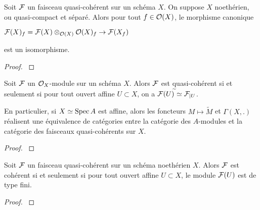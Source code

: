 \begin{prop}\label{FQCProp2}
Soit $\mathcal{F}$ un faisceau quasi-cohérent sur un schéma $X$. On suppose $X$ noethérien, ou quasi-compact et séparé. Alors pour tout $f\in \mathcal{O}(X)$, le morphisme canonique
\begin{center}
$\mathcal{F}(X)_f=\mathcal{F}(X)\otimes_{\mathcal{O}(X)}\mathcal{O}(X)_f\rightarrow \mathcal{F}(X_f)$
\end{center}
est un isomorphisme.
\end{prop}
\begin{proof}
\cite[5.1.6]{QingLiu}
\end{proof}

\begin{thm}\label{FQCThm}
Soit $\mathcal{F}$ un $\mathcal{O}_X$-module sur un schéma $X$. Alors $\mathcal{F}$ est quasi-cohérent si et seulement si pour tout ouvert affine $U\subset X$, on a $\mathcal{F}(U)^{\widetilde{}}\simeq\mathcal{F}_{|U}$.

En particulier, si $X\simeq \operatorname{Spec} A$ est affine, alors les foncteurs $M\mapsto \widetilde{M}$ et $\Gamma(X,.)$ réalisent une équivalence de catégories entre la catégorie des $A$-modules et la catégorie des faisceaux quasi-cohérents sur $X$.
\end{thm}
\begin{proof}
\cite[5.1.7]{QingLiu}
\end{proof}

\begin{prop}
Soit $\mathcal{F}$ un faisceau quasi-cohérent sur un schéma noethérien $X$. Alors $\mathcal{F}$ est cohérent si et seulement si pour tout ouvert affine $U\subset X$, le module $\mathcal{F}(U)$ est de type fini. 
\end{prop}
\begin{proof}
\cite[5.1.11]{QingLiu}
\end{proof}


